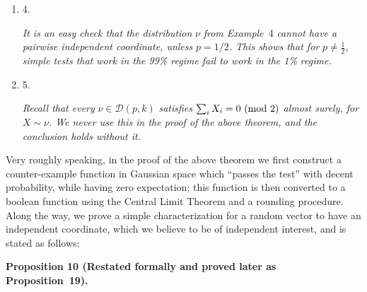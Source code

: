 \begin{enumerate}
\emph{for distributions }$\nu\in\mathcal{D}(p,4)$\emph{ with full even-weight support, and }$g_{1},\dots,g_{4}:\left\{0,1\right\}^{n}\to\mathop{\mathbb{R}}$\emph{ bounded, noise stable, and resilient functions.}\par





\item[] 
4. 


\emph{It is an easy check that the distribution }$\nu$\emph{ from Example }4\emph{ cannot have a pairwise independent coordinate, unless }$p=1/2$\emph{. This shows that for }$p\not=\frac{1}{2}$\emph{, simple tests that work in the 99\% regime fail to work in the 1\% regime.}\par





\item[] 
5. 


\emph{Recall that every }$\nu\in\mathcal{D}(p,k)$\emph{ satisfies }$\sum_{i}X_{i}=0\textnormal{ (mod 2)}$\emph{ almost surely, for }$X\sim\nu$\emph{. We never use this in the proof of the above theorem, and the conclusion holds without it.}\par





\end{enumerate}






Very roughly speaking, in the proof of the above theorem we first construct a counter-example function in Gaussian space which “passes the test” with decent probability, while having zero expectation; this function is then converted to a boolean function using the Central Limit Theorem and a rounding procedure.
Along the way, we prove a simple characterization for a random vector to have an independent coordinate, which we believe to be of independent interest, and is stated as follows:\par





\par\medskip\noindent\textbf{
\textbf{Proposition 10}\textbf{ }(Restated formally and proved later as Proposition 19)\textbf{.}
}\par



